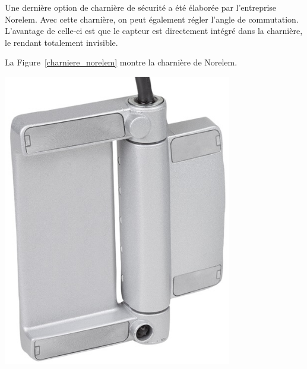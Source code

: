 \begin{minipage}[c]{0.6\textwidth}
    Une dernière option de charnière de sécurité a été élaborée par l'entreprise Norelem. Avec cette charnière, on peut également régler l'angle de commutation. L'avantage de celle-ci est que le capteur est directement intégré dans la charnière, le rendant totalement invisible.

    La Figure~\ref{charniere_norelem} montre la charnière de Norelem.
\end{minipage}\hfill
\begin{minipage}[c]{0.35\textwidth}
    \begin{center}
        \includegraphics[width=0.75\textwidth]{assets/figures/Protections_laser/Securite_electrique/charniere_norelem.jpeg}
    \end{center}
    \label{charniere_norelem}
\end{minipage}


